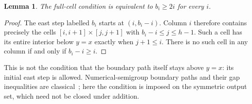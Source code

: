 \documentclass[11pt,a4paper]{article}
\newtheorem{lemma}[theorem]{Lemma}
\theoremstyle{definition}
\theoremstyle{remark}
\begin{document}
\begin{lemma}\label{lem:cells}
The full-cell condition is equivalent to $b_i\geq2i$ for every $i$.
\end{lemma}
\begin{proof}
The east step labelled $b_i$ starts at $(i,b_i-i)$.
Column $i$ therefore contains precisely the cells
$[i,i+1]\times[j,j+1]$ with $b_i-i\leq j\leq h-1$.
Such a cell has its entire interior below $y=x$ exactly when $j+1\leq i$.
There is no such cell in any column if and only if $b_i-i\geq i$.
\end{proof}
This is not the condition that the boundary path itself stays above $y=x$:
its initial east step is allowed. Numerical-semigroup boundary paths and
their gap inequalities are classical~\cite[Theorem~4.3]{BM}; here the
condition is imposed on the symmetric output set, which need not be closed
under addition.

\end{document}
